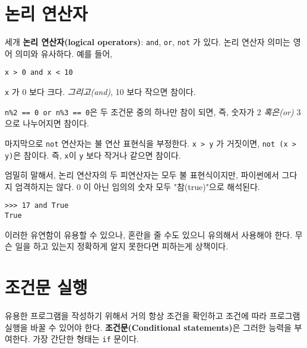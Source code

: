 
\section {논리 연산자}

세개 {\bf 논리 연산자(logical operators)}: {\tt and}, {\tt or}, {\tt not} 가 있다. 
논리 연산자 의미는 영어 의미와 유사하다. 예를 들어,

{\tt x > 0 and x < 10} 

{\tt x} 가 0 보다 크다. \emph{그리고(and)}, 10 보다 작으면 참이다.



{\tt n\%2 == 0 or n\%3 == 0}은 두 조건문 중의 하나만 참이 되면, 즉, 숫자가 2 \emph{혹은(or)} 3으로 나누어지면 참이다.

마지막으로 {\tt not} 연산자는 불 연산 표현식을 부정한다. 
{\tt x > y} 가 거짓이면, {\tt not (x > y)}은 참이다. 즉, {\tt x}이 {\tt y} 보다 작거나 같으면 참이다.

엄밀히 말해서, 논리 연산자의 두 피연산자는 모두 불 표현식이지만, 파이썬에서 그다지 엄격하지는 않다. 
0 이 아닌 임의의 숫자 모두 "참(true)"으로 해석된다.

\beforeverb
\begin{verbatim}
>>> 17 and True
True
\end{verbatim}
\afterverb
%

이러한 유연함이 유용할 수 있으나, 혼란을 줄 수도 있으니 유의해서 사용해야 한다. 
무슨 일을 하고 있는지 정확하게 알지 못한다면 피하는게 상책이다.

\section{조건문 실행}


유용한 프로그램을 작성하기 위해서 거의 항상 조건을 확인하고 조건에 따라 프로그램 실행을 바꿀 수 있어야 한다.
{\bf 조건문(Conditional statements)}은 그러한 능력을 부여한다. 
가장 간단한 형태는  {\tt if} 문이다.

